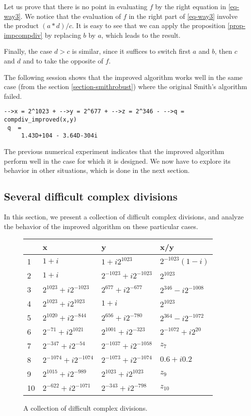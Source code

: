 \documentclass{paper}
\begin{document}
Let us prove that there is no point 
in evaluating $f$ by the right equation in \ref{eq-way3}.
We notice that the evaluation of $f$ in the right 
part of \ref{eq-way3} involve the product $(a*d)/c$.
It is easy to see that we can apply the proposition \ref{prop-impcompdiv} 
by replacing $b$ by $a$, which leads to the result. 

Finally, the case $d>c$ is similar, since it suffices to switch first 
$a$ and $b$, then $c$ and $d$ and to take the opposite of $f$. 

The following session shows that the improved algorithm works well in the 
same case (from the section \ref{section-smithrobust}) where the original 
Smith's algorithm failed.
\lstset{language=scilabscript}
\begin{lstlisting}
-->x = 2^1023 + -->y = 2^677 + -->z = 2^346 - -->q = compdiv_improved(x,y)
 q  =
     1.43D+104 - 3.64D-304i 
\end{lstlisting}

The previous numerical experiment indicates that the improved 
algorithm perform well in the case for which it is designed. 
We now have to explore its behavior in other situations, which 
is done in the next section. 


\subsection{Several difficult complex divisions}
\label{section-difficultcases}

In this section, we present a collection of difficult complex 
divisions, and analyze the behavior of the improved algorithm 
on these particular cases. 

\begin{figure}
\caption{A collection of difficult complex divisions.}
\label{fig-compdiv-diffcasespres}
\begin{center}
\begin{tabular}{l|lll@{}}
  & x & y & x/y \\
\hline
1 & $1+i$                   & $1+i 2^{1023}$            & $2^{-1023}(1-i)$\\
2 & $1+i$                   & $2^{-1023}+i 2^{-1023}$   & $2^{1023}$ \\
3 & $2^{1023}+i 2^{-1023}$  & $2^{677}+i 2^{-677}$      & $2^{346}-i 2^{-1008}$ \\
4 & $2^{1023}+i 2^{1023}$   & $1+i$                     & $2^{1023}$ \\
5 & $2^{1020}+i 2^{-844}$   & $2^{656}+i 2^{-780}$      & $2^{364}-i 2^{-1072}$ \\
6 & $2^{-71} + i 2^{1021}$  & $2^{1001} + i   2^{-323}$ & $2^{-1072} + i   2^{20}$ \\
7 & $2^{-347}+i 2^{-54}$    & $2^{-1037}+i 2^{-1058}$   & $z_7$ \\
8 & $2^{-1074}+i 2^{-1074}$ & $2^{-1073}+i 2^{-1074}$   & $0.6+i 0.2$ \\
9 & $2^{1015}+i 2^{-989}$   & $2^{1023}+i 2^{1023}$     & $z_9$ \\
10& $2^{-622}+i 2^{-1071}$  & $2^{-343}+i 2^{-798}$     & $z_{10}$
\end{tabular}
\end{center}
\end{figure}
\end{document}
